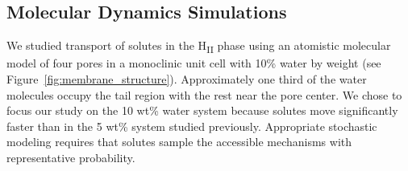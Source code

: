 \documentclass[12pt]{article}
\begin{document}
  \subsection{Molecular Dynamics Simulations}

  We studied transport of solutes in the H\textsubscript{II} phase using an atomistic
  molecular model of four pores in a monoclinic unit cell with 10\% water by weight 
  (see Figure~\ref{fig:membrane_structure}). Approximately one third of the water 
  molecules occupy the tail region with the rest near the pore center. We chose to
  focus our study on the 10 wt\% water system because solutes move significantly 
  faster than in the 5 wt\% system studied previously. Appropriate stochastic 
  modeling requires that solutes sample the accessible mechanisms with representative
  probability.
  
\end{document}
